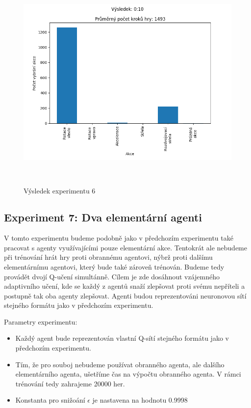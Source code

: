 \begin{figure}[p]\centering
\includegraphics[width=145mm, height=110mm]{./Obrazky/Experiment06Results.png}
\caption{Výsledek experimentu 6}
\label{Výsledek experimentu 06}
\end{figure}
    



\newpage
\subsection{Experiment 7: Dva elementární agenti}
V tomto experimentu budeme podobně jako v předchozím experimentu také pracovat s agenty využívajícími pouze elementární akce.
Tentokrát ale nebudeme při trénování hrát hry proti obrannému agentovi, nýbrž proti dalšímu elementárnímu agentovi, který bude také zároveň trénován.
Budeme tedy provádět dvojí Q-učení simultánně. Cílem je zde dosáhnout vzájemného adaptivního učení, kde se každý z agentů snaží zlepšovat proti svému nepříteli a postupně tak oba agenty zlepšovat.
Agenti budou reprezentováni neuronovou sítí stejného formátu jako v předchozím experimentu.

\par


Parametry experimentu:
\begin{itemize}
    \item Každý agent bude reprezentován vlastní Q-sítí stejného formátu jako v předchozím experimentu.
    \item Tím, že pro souboj nebudeme používat obranného agenta, ale dalšího elementárního agenta, ušetříme čas na výpočtu obranného agenta. V rámci trénování tedy zahrajeme 20000 her.  
    \item Konstanta pro snižoání $\epsilon$ je nastavena na hodnotu 0.9998
\end{itemize}


